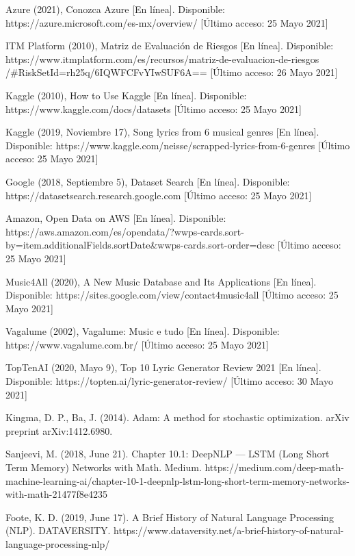 \documentclass[12pt, a4paper, titlepage]{report}
\begin{document}
\begin{thebibliography}{20}
	Azure (2021), Conozca Azure [En línea]. Disponible: https://azure.microsoft.com/es-mx/overview/ [Último acceso: 25 Mayo 2021]
	
	ITM Platform (2010), Matriz de Evaluación de Riesgos [En línea]. Disponible: https://www.itmplatform.com/es/recursos/matriz-de-evaluacion-de-riesgos
	/\#RiskSetId=rh25q/6IQWFCFvYIwSUF6A== [Último acceso: 26 Mayo 2021]
	
	Kaggle (2010), How to Use Kaggle [En línea]. Disponible: https://www.kaggle.com/docs/datasets [Último acceso: 25 Mayo 2021]
	
	Kaggle (2019, Noviembre 17), Song lyrics from 6 musical genres [En línea]. Disponible: https://www.kaggle.com/neisse/scrapped-lyrics-from-6-genres [Último acceso: 25 Mayo 2021]
		
	Google (2018, Septiembre 5), Dataset Search [En línea]. Disponible: https://datasetsearch.research.google.com [Último acceso: 25 Mayo 2021]
	
	Amazon, Open Data on AWS [En línea]. Disponible: https://aws.amazon.com/es/opendata/?wwps-cards.sort-by=item.additionalFields.sortDate\&wwps-cards.sort-order=desc [Último acceso: 25 Mayo 2021]
	
	Music4All (2020), A New Music Database and Its Applications [En línea]. Disponible: https://sites.google.com/view/contact4music4all [Último acceso: 25 Mayo 2021]
	
	Vagalume (2002), Vagalume: Music e tudo [En línea]. Disponible: https://www.vagalume.com.br/ [Último acceso: 25 Mayo 2021]
	
	TopTenAI (2020, Mayo 9), Top 10 Lyric Generator Review 2021 [En línea]. Disponible: https://topten.ai/lyric-generator-review/ [Último acceso: 30 Mayo 2021]
	
	Kingma, D. P., Ba, J. (2014). Adam: A method for stochastic optimization. arXiv preprint arXiv:1412.6980.
	
	Sanjeevi, M. (2018, June 21). Chapter 10.1: DeepNLP — LSTM (Long Short Term Memory) Networks with Math. Medium. https://medium.com/deep-math-machine-learning-ai/chapter-10-1-deepnlp-lstm-long-short-term-memory-networks-with-math-21477f8e4235
	 
	Foote, K. D. (2019, June 17). A Brief History of Natural Language Processing (NLP). DATAVERSITY. https://www.dataversity.net/a-brief-history-of-natural-language-processing-nlp/
	 

\end{thebibliography}
\end{document}
